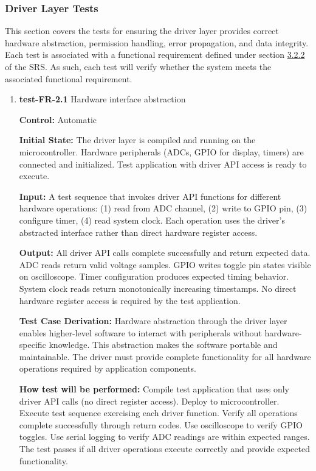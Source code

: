 \documentclass[12pt, titlepage]{article}
\begin{document}
\subsubsection{Driver Layer Tests}

This section covers the tests for ensuring the driver layer provides correct 
hardware abstraction, permission handling, error propagation, and data integrity. 
Each test is associated with a functional requirement defined under section 
\hyperref[SRS-sec:FR2]{3.2.2} of the SRS. As such, each test will verify whether 
the system meets the associated functional requirement.

\begin{enumerate}

\item{\textbf{test-FR-2.1} Hardware interface abstraction \\}

\textbf{Control:} Automatic
					
\textbf{Initial State:} 
The driver layer is compiled and running on the microcontroller. Hardware 
peripherals (ADCs, GPIO for display, timers) are connected and initialized. 
Test application with driver API access is ready to execute.
					
\textbf{Input:}
A test sequence that invokes driver API functions for different hardware 
operations: (1) read from ADC channel, (2) write to GPIO pin, (3) configure 
timer, (4) read system clock. Each operation uses the driver's abstracted 
interface rather than direct hardware register access.
					
\textbf{Output:}
All driver API calls complete successfully and return expected data. ADC reads 
return valid voltage samples. GPIO writes toggle pin states visible on 
oscilloscope. Timer configuration produces expected timing behavior. System 
clock reads return monotonically increasing timestamps. No direct hardware 
register access is required by the test application.

\textbf{Test Case Derivation:} 
Hardware abstraction through the driver layer enables higher-level software 
to interact with peripherals without hardware-specific knowledge. This abstraction 
makes the software portable and maintainable. The driver must provide complete 
functionality for all hardware operations required by application components.
					
\textbf{How test will be performed:}
Compile test application that uses only driver API calls (no direct register 
access). Deploy to microcontroller. Execute test sequence exercising each driver 
function. Verify all operations complete successfully through return codes. 
Use oscilloscope to verify GPIO toggles. Use serial logging to verify ADC 
readings are within expected ranges. The test passes if all driver operations 
execute correctly and provide expected functionality.


\end{enumerate}
\end{document}
